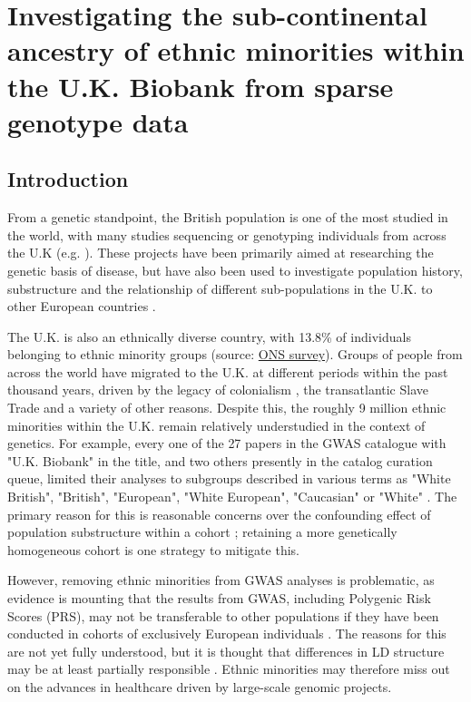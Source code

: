 \chapter{Investigating the sub-continental ancestry of ethnic minorities within the U.K. Biobank from sparse genotype data}
\label{chapterlabel3}

\section{Introduction}

From a genetic standpoint, the British population is one of the most studied in the world, with many studies sequencing or genotyping individuals from across the U.K (e.g. \cite{bycroft2018UK, Leslie2015, turnbull2018introducing, UK10k2015UK10k}). These projects have been primarily aimed at researching the genetic basis of disease, but have also been used to investigate population history, substructure  and the relationship of different sub-populations in the U.K. to other European countries \cite{Leslie2015, schiffels2016iron, liu2020human}.  

The U.K. is also an ethnically diverse country, with 13.8\% of individuals belonging to ethnic minority groups (source: \href{https://www.ons.gov.U.K./peoplepopulationandcommunity/populationandmigration/populationestimates/articles/researchreportonpopulationestimatesbyethnicgroupandreligion/2019-12-04}{ONS survey}). Groups of people from across the world have migrated to the U.K. at different periods within the past thousand years, driven by the legacy of colonialism \cite{nasta2005voyaging}, the transatlantic Slave Trade and a variety of other reasons. Despite this, the roughly 9 million ethnic minorities within the U.K. remain relatively understudied in the context of genetics. For example, every one of the 27 papers in the GWAS catalogue with "U.K. Biobank" in the title, and two others presently in the catalog curation queue, limited their analyses to subgroups described in various terms as "White British", "British", "European", "White European", "Caucasian" or "White" \cite{manolio2019using}. The primary reason for this is reasonable concerns over the confounding effect of population substructure within a cohort \cite{hellwege2017population}; retaining a more genetically homogeneous cohort is one strategy to mitigate this. 

However, removing ethnic minorities from GWAS analyses is problematic, as evidence is mounting that the results from GWAS, including Polygenic Risk Scores (PRS), may not be transferable to other populations if they have been conducted in cohorts of exclusively European individuals \cite{kuchenbaecker2019transferability, martin2017human, bustamante2011genomics}. The reasons for this are not yet fully understood, but it is thought that differences in LD structure may be at least partially responsible \cite{vilhjalmsson2015modeling}. Ethnic minorities may therefore miss out on the advances in healthcare driven by large-scale genomic projects. 

